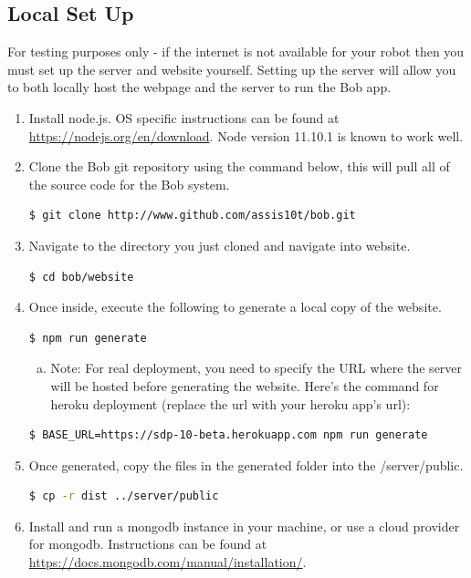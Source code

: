 \documentclass[onecolumn]{IEEEtran}
\begin{document}
\subsection{Local Set Up}
For testing purposes only - if the internet is not available for your robot then you must set up the server and website yourself. Setting up the server will allow you to both locally host the webpage and the server to run the Bob app.
\begin{enumerate}
    \item Install node.js. OS specific instructions can be found at \underline{https://nodejs.org/en/download}. Node version 11.10.1 is known to work well.
    \item Clone the Bob git repository using the command below, this will pull all of the source code for the Bob system.
    \begin{lstlisting}[language=bash]
    $ git clone http://www.github.com/assis10t/bob.git
    \end{lstlisting}
    \item Navigate to the directory you just cloned and navigate into website. 
    \begin{lstlisting}[language=bash]
    $ cd bob/website
    \end{lstlisting}
    \item Once inside, execute the following to generate a local copy of the website. \begin{lstlisting}[language=bash]
    $ npm run generate
    \end{lstlisting}
    \begin{enumerate}[(a)]
        \item Note: For real deployment, you need to specify the URL where the server will be hosted before generating the website. Here’s the command for heroku deployment (replace the url with your heroku app's url): 
    \end{enumerate}
    \begin{lstlisting}[language=bash]
    $ BASE_URL=https://sdp-10-beta.herokuapp.com npm run generate
    \end{lstlisting}
    \item Once generated, copy the files in the generated folder into the /server/public.
    \begin{lstlisting}[language=bash]
    $ cp -r dist ../server/public
    \end{lstlisting}
    \item Install and run a mongodb instance in your machine, or use a cloud provider for mongodb. Instructions can be found at \underline{https://docs.mongodb.com/manual/installation/}.

\end{enumerate}
\end{document}
